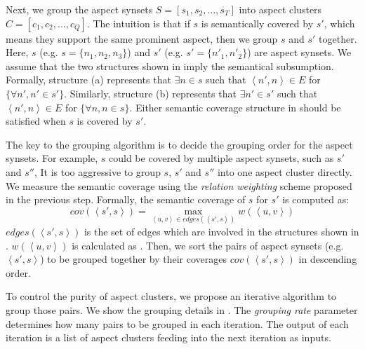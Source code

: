 Next, we group the aspect synsets $S=[s_1, s_2, ..., s_T]$
into aspect clusters $C=[c_1, c_2, ..., c_Q]$.
The intuition is that if $s$ is semantically covered 
by $s'$, 
which means they support the same prominent aspect,
then we group $s$ and $s'$ together.
Here, $s$ (e.g. $s=\{n_1, n_2, n_3\}$) and 
$s'$ (e.g. $s'=\{n'_1, n'_2\}$)
are aspect synsets.
We assume that the two structures 
shown in  imply
the semantical subsumption.
Formally, structure (a) represents that 
$\exists n \in s$ such that
$\left\langle n',n \right\rangle \in E$
for $ \{\forall n', n'\in s'\}$. 
Similarly, structure (b) represents that 
$\exists n' \in s'$ such that
$\left\langle n',n \right\rangle \in E$
for $ \{\forall n, n\in s\}$. 
Either semantic coverage structure 
in  should be
satisfied when $s$ is covered by $s'$.

The key to the grouping algorithm
is to decide the grouping order for the aspect synsets.
For example, $s$ could be covered by multiple 
aspect synsets, such as $s'$ and $s''$, 
It is too aggressive to group 
$s$, $s'$ and $s''$ into one aspect cluster directly.
We measure the semantic coverage using the 
\textit{relation weighting} scheme proposed in the previous step.
Formally, the semantic coverage of $s$ for $s'$ is
computed as: 
\begin{equation}
	cov(\left\langle s',s\right\rangle)=\displaystyle\max_{\left\langle u,v\right\rangle \in edges(\left\langle s',s\right\rangle)} w(\left\langle u,v\right\rangle)
	\label{eq:coverage}
\end{equation}
$edges(\left\langle s',s\right\rangle)$ is the set of edges
which are involved in the structures shown in .
$w(\left\langle u,v\right\rangle)$ is calculated as .
Then, we sort the pairs of aspect synsets (e.g. $\left\langle s',s\right\rangle$) 
to be grouped together by their coverages $cov(\left\langle s',s\right\rangle)$ in descending order.

To control the purity of aspect clusters,
we propose an iterative algorithm to group those pairs.
We show the grouping details in .
The \textit{grouping rate} parameter determines how many
pairs to be grouped in each iteration.
The output of each iteration is a list of aspect clusters
feeding into the next iteration as inputs.

